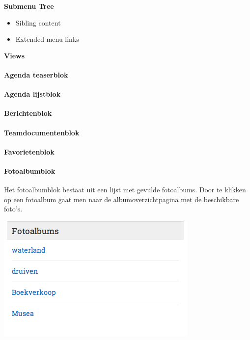 \textbf{Submenu Tree}

\begin{itemize}
\item Sibling content
\item Extended menu links
\end{itemize}

\textbf{Views}

\paragraph{Agenda teaserblok}

\paragraph{Agenda lijstblok}

\paragraph{Berichtenblok}

\paragraph{Teamdocumentenblok}

\paragraph{Favorietenblok}

\paragraph{Fotoalbumblok}\label{fotoalbumblok}

Het fotoalbumblok bestaat uit een lijst met gevulde fotoalbums. Door te klikken op een fotoalbum gaat men naar de albumoverzichtpagina met de beschikbare foto's.

\includegraphics{img/blokken/fotoalbum.png}

